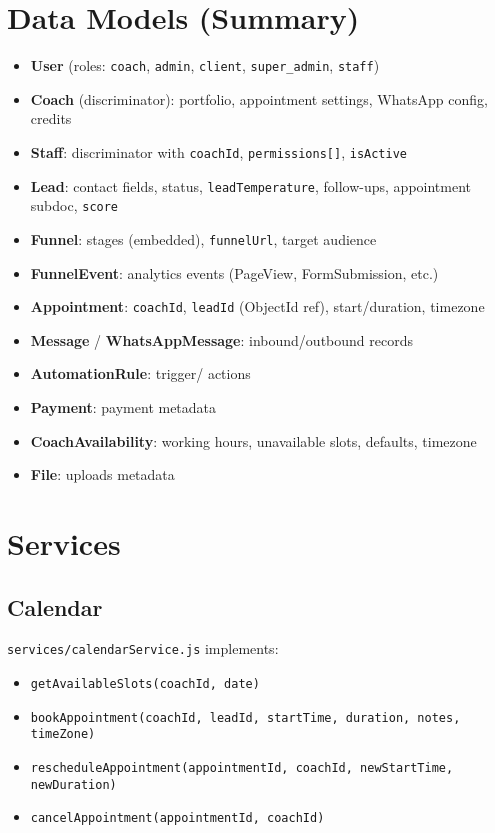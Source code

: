 \documentclass[11pt,a4paper]{article}
\begin{document}
\section{Data Models (Summary)}
\begin{itemize}
  \item \textbf{User} (roles: \texttt{coach}, \texttt{admin}, \texttt{client}, \texttt{super\_admin}, \texttt{staff})
  \item \textbf{Coach} (discriminator): portfolio, appointment settings, WhatsApp config, credits
  \item \textbf{Staff}: discriminator with \texttt{coachId}, \texttt{permissions[]}, \texttt{isActive}
  \item \textbf{Lead}: contact fields, status, \texttt{leadTemperature}, follow-ups, appointment subdoc, \texttt{score}
  \item \textbf{Funnel}: stages (embedded), \texttt{funnelUrl}, target audience
  \item \textbf{FunnelEvent}: analytics events (PageView, FormSubmission, etc.)
  \item \textbf{Appointment}: \texttt{coachId}, \texttt{leadId} (ObjectId ref), start/duration, timezone
  \item \textbf{Message} / \textbf{WhatsAppMessage}: inbound/outbound records
  \item \textbf{AutomationRule}: trigger/ actions
  \item \textbf{Payment}: payment metadata
  \item \textbf{CoachAvailability}: working hours, unavailable slots, defaults, timezone
  \item \textbf{File}: uploads metadata
\end{itemize}

\section{Services}
\subsection{Calendar}
\texttt{services/calendarService.js} implements:
\begin{itemize}[noitemsep]
  \item \texttt{getAvailableSlots(coachId, date)}
  \item \texttt{bookAppointment(coachId, leadId, startTime, duration, notes, timeZone)}
  \item \texttt{rescheduleAppointment(appointmentId, coachId, newStartTime, newDuration)}
  \item \texttt{cancelAppointment(appointmentId, coachId)}
\end{itemize}
\end{document}
